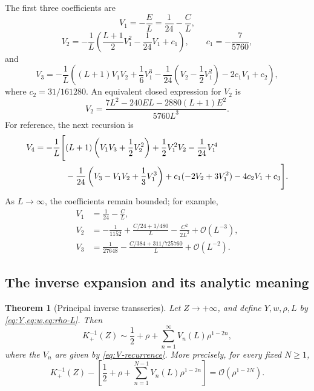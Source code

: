 \documentclass[11pt,a4paper]{article}
\numberwithin{equation}{section}
\newtheorem{theorem}{Theorem}[section]
\theoremstyle{remark}
\newcommand{\Kinv}{K_{+}^{-1}}
\newcommand{\bigO}{\mathcal O}
\begin{document}
The first three coefficients are
\begin{equation}
V_1=-\frac{E}{L}=\frac1{24}-\frac{C}{L},
\label{eq:V1}
\end{equation}
\begin{equation}
V_2=-\frac1L\left(
\frac{L+1}{2}V_1^2-\frac1{24}V_1+c_1
\right),
\qquad c_1=-\frac7{5760},
\label{eq:V2}
\end{equation}
and
\begin{equation}
V_3=-\frac1L\left(
(L+1)V_1V_2+\frac16V_1^3
-\frac1{24}\left(V_2-\frac12V_1^2\right)
-2c_1V_1+c_2
\right),
\label{eq:V3}
\end{equation}
where \(c_2=31/161280\).  An equivalent closed expression for \(V_2\) is
\begin{equation}
V_2=
\frac{7L^2-240EL-2880(L+1)E^2}{5760L^3}.
\label{eq:V2-E}
\end{equation}
For reference, the next recursion is
\begin{align}
V_4=-\frac1L\Bigg[{}
&(L+1)\left(V_1V_3+\frac12V_2^2\right)
+\frac12V_1^2V_2-\frac1{24}V_1^4
\notag\\
&-\frac1{24}\left(V_3-V_1V_2+\frac13V_1^3\right)
+c_1(-2V_2+3V_1^2)-4c_2V_1+c_3
\Bigg].
\label{eq:V4}
\end{align}
As \(L\to\infty\), the coefficients remain bounded; for example,
\begin{align*}
V_1&=\frac1{24}-\frac{C}{L},\\
V_2&=-\frac1{1152}+\frac{C/24+1/480}{L}
-\frac{C^2}{2L^2}+\bigO(L^{-3}),\\
V_3&=\frac1{27648}-\frac{C/384+311/725760}{L}
+\bigO(L^{-2}).
\end{align*}

\subsection{The inverse expansion and its analytic meaning}

\begin{theorem}[Principal inverse transseries]
\label{thm:principal-inverse-transseries}
Let \(Z\to+\infty\), and define \(Y,w,\rho,L\) by
\cref{eq:Y,eq:w,eq:rho-L}.  Then
\begin{equation}
\boxed{
\Kinv(Z)\sim \frac12+\rho+
\sum_{n=1}^{\infty}V_n(L)\rho^{1-2n},
}
\label{eq:principal-inverse-transseries}
\end{equation}
where the \(V_n\) are given by \cref{eq:V-recurrence}.  More precisely, for
every fixed \(N\ge1\),
\begin{equation}
\Kinv(Z)-\left[
\frac12+\rho+
\sum_{n=1}^{N-1}V_n(L)\rho^{1-2n}
\right]
=\bigO\!\left(\rho^{1-2N}\right).
\label{eq:canonical-error}
\end{equation}
\end{theorem}
\end{document}
